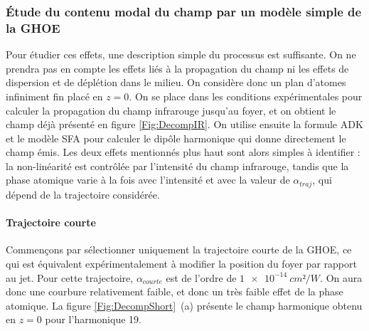 \subsubsection{\'{E}tude du contenu modal du champ par un modèle simple de la GHOE}
Pour étudier ces effets, une description simple du processus est suffisante. On ne prendra pas en compte les effets liés à la propagation du champ ni les effets de dispersion et de déplétion dans le milieu. On considère donc un plan d'atomes infiniment fin placé en $z=0$. On se place dans les conditions expérimentales pour calculer la propagation du champ infrarouge jusqu'au foyer, et on obtient le champ déjà présenté en figure \ref{Fig:DecompIR}. On utilise ensuite la formule ADK  et le modèle SFA  pour calculer le dipôle harmonique qui donne directement le champ émis. Les deux effets mentionnés plus haut sont alors simples à identifier : la non-linéarité est contrôlée par l'intensité du champ infrarouge, tandis que la phase atomique varie à la fois avec l'intensité et avec la valeur de $\alpha_{traj}$, qui dépend de la trajectoire considérée.

\paragraph*{Trajectoire courte} Commençons par sélectionner uniquement la trajectoire courte de la GHOE, ce qui est équivalent expérimentalement à modifier la position du foyer par rapport au jet. Pour cette trajectoire, $\alpha_{courte}$ est de l'ordre de $\SI{1e-14}{cm²/W}$. On aura donc une courbure relativement faible, et donc un très faible effet de la phase atomique. La figure \ref{Fig:DecompShort}~(a) présente le champ harmonique obtenu en $z=0$ pour l'harmonique 19.

